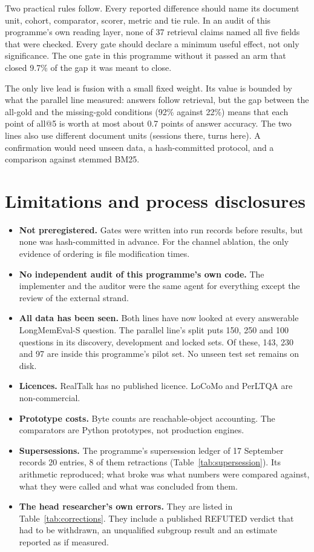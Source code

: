 \documentclass[11pt,a4paper]{article}
\begin{document}
Two practical rules follow. Every reported difference should name its document unit, cohort, comparator, scorer, metric and tie rule. In an audit of this programme's own reading layer, none of 37 retrieval claims named all five fields that were checked. Every gate should declare a minimum useful effect, not only significance. The one gate in this programme without it passed an arm that closed 9.7\% of the gap it was meant to close.

The only live lead is fusion with a small fixed weight. Its value is bounded by what the parallel line measured: answers follow retrieval, but the gap between the all-gold and the missing-gold conditions (92\% against 22\%) means that each point of all@5 is worth at most about 0.7 points of answer accuracy. The two lines also use different document units (sessions there, turns here). A confirmation would need unseen data, a hash-committed protocol, and a comparison against stemmed BM25.

\section{Limitations and process disclosures}\label{sec:limits}
\begin{itemize}\setlength{\itemsep}{1pt}
\item \textbf{Not preregistered.} Gates were written into run records before results, but none was hash-committed in advance. For the channel ablation, the only evidence of ordering is file modification times.
\item \textbf{No independent audit of this programme's own code.} The implementer and the auditor were the same agent for everything except the review of the external strand.
\item \textbf{All data has been seen.} Both lines have now looked at every answerable LongMemEval-S question. The parallel line's split puts 150, 250 and 100 questions in its discovery, development and locked sets. Of these, 143, 230 and 97 are inside this programme's pilot set. No unseen test set remains on disk.
\item \textbf{Licences.} RealTalk has no published licence. LoCoMo and PerLTQA are non-commercial.
\item \textbf{Prototype costs.} Byte counts are reachable-object accounting. The comparators are Python prototypes, not production engines.
\item \textbf{Supersessions.} The programme's supersession ledger of 17 September records 20 entries, 8 of them retractions (Table~\ref{tab:supersession}). Its arithmetic reproduced; what broke was what numbers were compared against, what they were called and what was concluded from them.
\item \textbf{The head researcher's own errors.} They are listed in Table~\ref{tab:corrections}. They include a published REFUTED verdict that had to be withdrawn, an unqualified subgroup result and an estimate reported as if measured.
\end{itemize}
\end{document}
